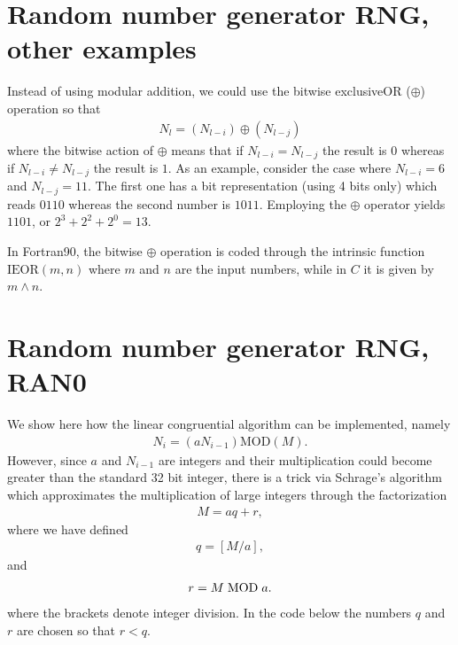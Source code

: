 \documentclass[letterpaper,10pt,english]{sphinxmanual}
\begin{document}
\section{Random number generator RNG, other examples}
\label{\detokenize{chapter3:id9}}
Instead of  using modular addition, we could use the bitwise
exclusive\sphinxhyphen{}OR (\(\oplus\)) operation so that
\begin{equation*}
\begin{split}
N_l=(N_{l-i})\oplus (N_{l-j})
\end{split}
\end{equation*}
where the bitwise action of \(\oplus\) means that if \(N_{l-i}=N_{l-j}\) the result is
\(0\) whereas if \(N_{l-i}\ne N_{l-j}\) the result is
\(1\). As an example, consider the case where  \(N_{l-i}=6\) and \(N_{l-j}=11\). The first
one has a bit representation (using 4 bits only) which reads \(0110\) whereas the
second number is \(1011\). Employing the \(\oplus\) operator yields
\(1101\), or \(2^3+2^2+2^0=13\).

In Fortran90, the bitwise \(\oplus\) operation is coded through the intrinsic
function \(\mathrm{IEOR}(m,n)\) where \(m\) and \(n\) are the input numbers, while in \(C\)
it is given by \(m\wedge n\).


\section{Random number generator RNG, RAN0}
\label{\detokenize{chapter3:random-number-generator-rng-ran0}}
We show here how the linear congruential algorithm can be implemented, namely
\begin{equation*}
\begin{split}
N_i=(aN_{i-1}) \mathrm{MOD} (M).
\end{split}
\end{equation*}
However, since \(a\) and \(N_{i-1}\) are integers and their multiplication
could become greater than the standard 32 bit integer, there is a trick via
Schrage’s algorithm which approximates the multiplication
of large integers through the factorization
\begin{equation*}
\begin{split}
M=aq+r,
\end{split}
\end{equation*}
where we have defined
\begin{equation*}
\begin{split}
q=[M/a],
\end{split}
\end{equation*}
and
\begin{equation*}
\begin{split}
r = M\hspace{0.1cm}\mathrm{MOD} \hspace{0.1cm}a.
\end{split}
\end{equation*}
where the brackets denote integer division. In the code below the numbers
\(q\) and \(r\) are chosen so that \(r < q\).
\end{document}
